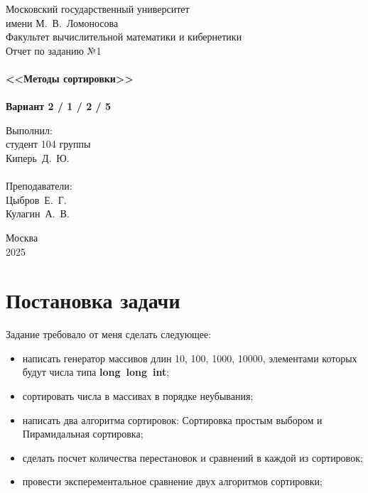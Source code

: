\documentclass[a4paper,12pt,titlepage,finall]{article}
\begin{document}
\begin{titlepage}
    \begin{center}
	{\small \sc Московский государственный университет \\имени М.~В.~Ломоносова\\
	Факультет вычислительной математики и кибернетики\\}
	\vfill
	{\Large \sc Отчет по заданию №1}\\
~\\
	{\large \bf <<Методы сортировки>>}\\ 
~\\
	{\large \bf Вариант 2 / 1 / 2 / 5}
    \end{center}
    \begin{flushright}
	\vfill {Выполнил:\\
	студент 104 группы\\
	Киперь~Д.~Ю.\\
~\\
	Преподаватели:\\
	Цыбров~Е.~Г.\\
    Кулагин~А.~В.}
    \end{flushright}
    \begin{center}
	\vfill
	{\small Москва\\2025}
    \end{center}
\end{titlepage}

\tableofcontents
\newpage

\section{Постановка задачи}
{\large Задание требовало от меня сделать следующее:}

\begin{itemize}
    \item написать генератор массивов длин 10, 100, 1000, 10000, элементами которых будут числа типа \textbf{long~long~int}; 
    \item сортировать числа в массивах в порядке неубывания;
    \item написать два алгоритма сортировок: Сортировка простым выбором и Пирамидальная сортировка;
    \item сделать посчет количества перестановок и сравнений в каждой из сортировок;
    \item провести эксперементальное сравнение двух алгоритмов сортировки;
\end{itemize}
\newpage
\end{document}
